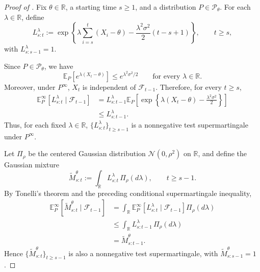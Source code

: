 \documentclass[12pt]{article}
\theoremstyle{spaced}
\theoremstyle{remark}
\begin{document}
\begin{proof}[Proof of ]
Fix $\theta\in\mathbb R$, a starting time $s\geq 1$, and a distribution
$P\in\mathcal P_\theta$. For each $\lambda\in\mathbb R$, define
\[
L_{s:t}^{\lambda}
:=
\exp\left\{
\lambda\sum_{i=s}^{t}(X_i-\theta)
-\frac{\lambda^2\sigma^2}{2}(t-s+1)
\right\},
\qquad t\geq s,
\]
with $L_{s:s-1}^{\lambda}=1$.

Since $P\in\mathcal P_\theta$, we have
\[
\mathbb E_P\!\left[
e^{\lambda(X_t-\theta)}
\right]
\leq
e^{\lambda^2\sigma^2/2}
\qquad
\text{for every }\lambda\in\mathbb R.
\]
Moreover, under $P^\infty$, $X_t$ is independent of
$\mathcal F_{t-1}$. Therefore, for every $t\geq s$,
\begin{align*}
\mathbb E_P^\infty
\left[
L_{s:t}^{\lambda}
\mid \mathcal F_{t-1}
\right]
&=
L_{s:t-1}^{\lambda}
\mathbb E_P
\left[
\exp\left\{
\lambda(X_t-\theta)
-\frac{\lambda^2\sigma^2}{2}
\right\}
\right] \\
&\leq
L_{s:t-1}^{\lambda}.
\end{align*}
Thus, for each fixed $\lambda\in\mathbb R$,
$\{L_{s:t}^{\lambda}\}_{t\geq s-1}$ is a nonnegative
test supermartingale under $P^\infty$.

Let $\Pi_\rho$ be the centered Gaussian distribution
$\mathcal N(0,\rho^2)$ on $\mathbb R$, and define the Gaussian mixture
\[
\widetilde M_{s:t}^{\theta}
:=
\int_{\mathbb R}
L_{s:t}^{\lambda}\,
\Pi_\rho(d\lambda),
\qquad
t\geq s-1.
\]
By Tonelli’s theorem and the preceding conditional supermartingale
inequality,
\begin{align*}
\mathbb E_P^\infty
\left[
\widetilde M_{s:t}^{\theta}
\mid\mathcal F_{t-1}
\right]
&=
\int_{\mathbb R}
\mathbb E_P^\infty
\left[
L_{s:t}^{\lambda}
\mid\mathcal F_{t-1}
\right]
\Pi_\rho(d\lambda) \\
&\leq
\int_{\mathbb R}
L_{s:t-1}^{\lambda}\,
\Pi_\rho(d\lambda) \\
&=
\widetilde M_{s:t-1}^{\theta}.
\end{align*}
Hence $\{\widetilde M_{s:t}^{\theta}\}_{t\geq s-1}$ is also a
nonnegative test supermartingale, with
$\widetilde M_{s:s-1}^{\theta}=1$.


\end{proof}
\end{document}
